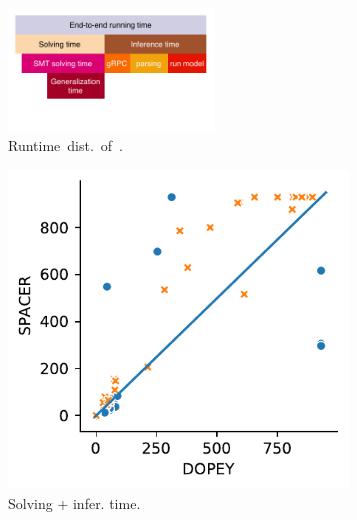 \begin{figure}[t]
  \begin{subfigure}[b]{0.8\textwidth}
  \centering
    \includegraphics[width=0.6\textwidth]{figures/doping-flame.pdf}
    \caption{\mbox{Runtime~dist.~of~\dpy.}}
    \label{subfig:dpy_vs_spc_ind_gen}
	\end{subfigure}
  \centering
  \begin{subfigure}[b]{0.24\textwidth}
  \centering
    \includegraphics[width=0.99\textwidth]{figures/res-dpy_vs_spc_total.pdf}
    \caption{Solving + infer. time.}
    \label{subfig:dpy_vs_spc_total}
	\end{subfigure}
  \begin{subfigure}[b]{0.24\textwidth}
  \centering

\end{subfigure}
\end{figure}
